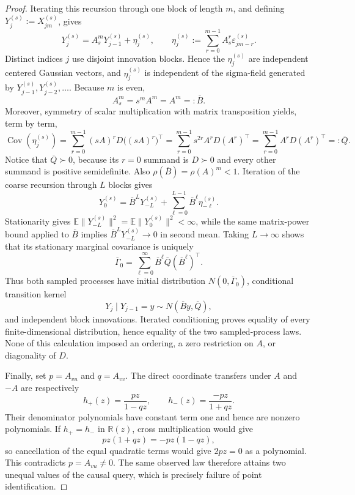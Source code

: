 \documentclass{article}
\begin{document}
\begin{proof}
Iterating this recursion through one block of length \(m\), and defining \(Y_j^{(s)}:=X_{jm}^{(s)}\), gives
\[
 Y_j^{(s)}=A_s^mY_{j-1}^{(s)}+\eta_j^{(s)},
 \qquad
 \eta_j^{(s)}:=\sum_{r=0}^{m-1}A_s^r\varepsilon_{jm-r}^{(s)}.
\]
Distinct indices \(j\) use disjoint innovation blocks.  Hence the \(\eta_j^{(s)}\) are independent centered Gaussian vectors, and \(\eta_j^{(s)}\) is independent of the sigma-field generated by \(Y_{j-1}^{(s)},Y_{j-2}^{(s)},\ldots\).  Because \(m\) is even,
\[
 A_s^m=s^mA^m=A^m=:\overline B.
\]
Moreover, symmetry of scalar multiplication with matrix transposition yields, term by term,
\[
 \operatorname{Cov}(\eta_j^{(s)})
 =\sum_{r=0}^{m-1}(sA)^rD\bigl((sA)^r\bigr)^\top
 =\sum_{r=0}^{m-1}s^{2r}A^rD(A^r)^\top
 =\sum_{r=0}^{m-1}A^rD(A^r)^\top
 =:\overline Q.
\]
Notice that \(\overline Q\succ0\), because its \(r=0\) summand is \(D\succ0\) and every other summand is positive semidefinite.  Also \(\rho(\overline B)=\rho(A)^m<1\).  Iteration of the coarse recursion through \(L\) blocks gives
\[
 Y_0^{(s)}=\overline B^L Y_{-L}^{(s)}
 +\sum_{\ell=0}^{L-1}\overline B^\ell\eta_{-\ell}^{(s)}.
\]
Stationarity gives \(\mathbb E\lVert Y_{-L}^{(s)}\rVert^2=\mathbb E\lVert Y_0^{(s)}\rVert^2<\infty\), while the same matrix-power bound applied to \(\overline B\) implies \(\overline B^L Y_{-L}^{(s)}\to0\) in second mean.  Taking \(L\to\infty\) shows that its stationary marginal covariance is uniquely
\[
 \overline\Gamma_0
 =\sum_{\ell=0}^{\infty}\overline B^\ell
      \overline Q(\overline B^\ell)^\top.
\]
Thus both sampled processes have initial distribution \(N(0,\overline\Gamma_0)\), conditional transition kernel
\[
 Y_j\mid Y_{j-1}=y\sim N(\overline B y,\overline Q),
\]
and independent block innovations.  Iterated conditioning proves equality of every finite-dimensional distribution, hence equality of the two sampled-process laws.  None of this calculation imposed an ordering, a zero restriction on \(A\), or diagonality of \(D\).

Finally, set \(p=A_{vu}\) and \(q=A_{vv}\).  The direct coordinate transfers under \(A\) and \(-A\) are respectively
\[
 h_+(z)=\frac{pz}{1-qz},
 \qquad
 h_-(z)=\frac{-pz}{1+qz}.
\]
Their denominator polynomials have constant term one and hence are nonzero polynomials.  If \(h_+=h_-\) in \(\mathbb R(z)\), cross multiplication would give
\[
 pz(1+qz)=-pz(1-qz),
\]
so cancellation of the equal quadratic terms would give \(2pz=0\) as a polynomial.  This contradicts \(p=A_{vu}\ne0\).  The same observed law therefore attains two unequal values of the causal query, which is precisely failure of point identification.
\end{proof}
\end{document}
